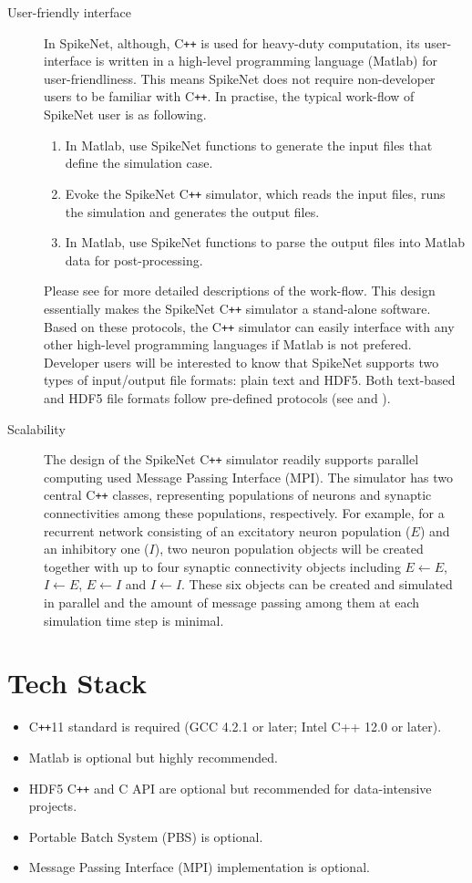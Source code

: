 \documentclass{article}
\begin{document}
\begin{description}
\item [User-friendly interface] In SpikeNet, although, C\texttt{++}  is used for heavy-duty computation, its user-interface is written in a high-level programming language (Matlab) for user-friendliness. This means SpikeNet does not require non-developer users to be familiar with C\texttt{++}. In practise, the typical work-flow of SpikeNet user is as following.
\begin{enumerate}
\item In Matlab, use SpikeNet functions to generate the input files that define the simulation case.
\item Evoke the SpikeNet C\texttt{++} simulator, which reads the input files, runs the simulation and generates the output files.
\item In Matlab, use SpikeNet functions to parse the output files into Matlab data for post-processing.
\end{enumerate}
Please see  for more detailed descriptions of the work-flow. 
This design essentially makes the SpikeNet C\texttt{++} simulator a stand-alone software. 
Based on these protocols, the C\texttt{++} simulator can easily interface with any other high-level programming languages if Matlab is not prefered.
Developer users will be interested to know that SpikeNet supports two types of input/output file formats: plain text and HDF5.
Both text-based and HDF5 file formats follow pre-defined protocols (see  and ). 

\item [Scalability] The design of the SpikeNet C\texttt{++} simulator readily supports parallel computing used Message Passing Interface (MPI). The simulator has two central C\texttt{++} classes, representing populations of neurons and synaptic connectivities among these populations, respectively. For example, for a recurrent network consisting of an excitatory neuron population ($E$) and an inhibitory one ($I$), two neuron population objects will be created together with up to four synaptic connectivity objects including $E\leftarrow E$, $I\leftarrow E$, $E\leftarrow I$ and $I\leftarrow I$. These six objects can be created and simulated in parallel and the amount of message passing among them at each simulation time step is minimal.  
\end{description}
 
\section{Tech Stack}
\begin{itemize}
\item C\texttt{++}11 standard is required (GCC 4.2.1 or later; Intel C++ 12.0 or later).
\item Matlab is optional but highly recommended.
\item HDF5 C\texttt{++} and C API are optional but recommended for data-intensive projects.
\item Portable Batch System (PBS) is optional.
\item Message Passing Interface (MPI) implementation is optional.
\end{itemize}
 
\end{document}
